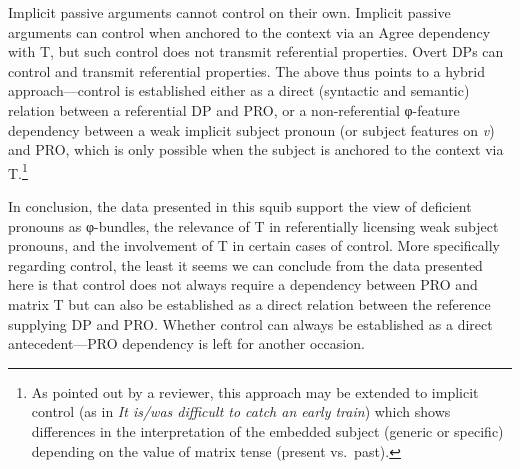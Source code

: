 \documentclass[output=paper]{langsci/langscibook}
\begin{document}
\ea
	\ea Implicit passive arguments cannot control on their own.
	\ex Implicit passive arguments can control when anchored to the context via an Agree dependency with T, but such control does not transmit referential properties.
	\ex Overt DPs can control and transmit referential properties.
	\z
\z
%
The above thus points to a hybrid approach—control is established either as a
direct (syntactic and semantic)  relation between a referential DP and
PRO, or a non-referential φ-feature dependency between a weak implicit subject
pronoun (or subject features on \emph{v}) and PRO, which is only possible when
the subject is anchored to the context via T.\footnote{As pointed out by a
    reviewer, this approach may be extended to implicit control (as in \emph{It
    is/was difficult to catch an early train}) which shows differences in the
interpretation of the embedded subject (generic or specific) depending on the
value of matrix tense (present vs.\ past).}

In conclusion, the data presented in this squib support the view of deficient
pronouns as φ-bundles, the relevance of T in referentially licensing weak
subject pronouns, and the involvement of T in certain cases of control. More
specifically regarding control, the least it seems we can conclude from the
data presented here is that control does not always require a dependency
between PRO and matrix T but can also be established as a direct relation
between the reference supplying DP and PRO. Whether control can always be
established as a direct antecedent—PRO dependency is left for another occasion.
\pagebreak
\printchapterglossary{}

{\sloppy\printbibliography[heading=subbibliography,notkeyword=this]}
\end{document}
